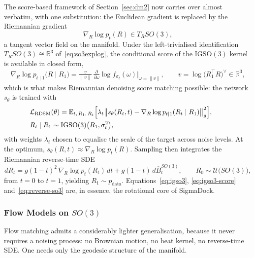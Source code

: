 \documentclass[a4paper,12pt]{article}
\theoremstyle{remark}
\begin{document}
The score-based framework of Section~\ref{sec:dm2} now carries over almost verbatim,
with one substitution: the Euclidean gradient is replaced by the Riemannian gradient
\[
\nabla_R\log p_t(R)\in T_RSO(3),
\]
a tangent vector field on the manifold. Under the left-trivialised identification
$T_RSO(3)\cong\mathbb R^3$ of~\eqref{eq:so3explog}, the conditional score of the
$\mathrm{IGSO}(3)$ kernel is available in closed form,
\begin{align}
\label{eq:igso3-score}
\nabla_R\log p_{t\mid1}\bigl(R\mid R_1\bigr)
=
\frac{v}{\|v\|}\,
\frac{\partial}{\partial\omega}\log f_{\sigma_t}(\omega)
\Big|_{\omega=\|v\|},
\qquad
v=\log\!\bigl(R_1^\top R\bigr)^\vee\in\mathbb R^3,
\end{align}
which is what makes Riemannian denoising score matching possible: the network
$s_\theta$ is trained with
\begin{align}
\label{eq:rdsm}
& \mathcal L_{\mathrm{RDSM}}(\theta)
=
\mathbb E_{t,\,R_1,\,R_t}
\Bigl[
\lambda_t
\bigl\|
s_\theta(R_t,t)-\nabla_R\log p_{t\mid1}(R_t\mid R_1)
\bigr\|_g^2
\Bigr],
\qquad
\\&R_t\mid R_1\sim\mathrm{IGSO}(3)\bigl(R_1,\sigma_t^2\bigr),
\end{align}
with weights $\lambda_t$ chosen to equalise the scale of the target across noise levels.
At the optimum, $s_\theta(R,t)\approx\nabla_R\log p_t(R)$. Sampling then integrates the
Riemannian reverse-time SDE
\begin{equation}
\label{eq:reverse-so3}
dR_t
=
g(1-t)^2\,\nabla_R\log p_t(R_t)\,dt
+
g(1-t)\,d\overline B_t^{SO(3)},
\qquad
R_0\sim\mathcal U\bigl(SO(3)\bigr),
\end{equation}
from $t=0$ to $t=1$, yielding $R_1\sim p_{\mathrm{data}}$. Equations~\eqref{eq:igso3},
\eqref{eq:igso3-score} and~\eqref{eq:reverse-so3} are, in essence, the rotational core
of SigmaDock.

\subsubsection{Flow Models on $SO(3)$}
\label{sec:fm-so3}

Flow matching admits a considerably lighter generalisation, because it never requires a
noising process: no Brownian motion, no heat kernel, no reverse-time SDE. One needs only
the geodesic structure of the manifold.
\end{document}
